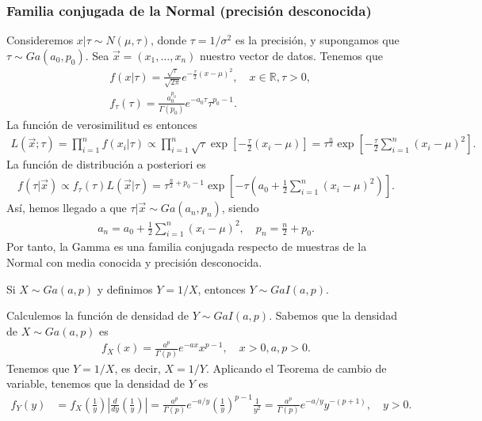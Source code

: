 \subsubsection{Familia conjugada de la Normal (precisión desconocida)}
Consideremos $x | \tau \sim N(\mu,\tau)$, donde $\tau = 1/\sigma^2$ es la precisión, y supongamos que $\tau \sim Ga(a_0,p_0)$. Sea $\vec{x} = (x_1,\ldots,x_n)$ nuestro vector de datos. Tenemos que
\begin{align*}
     & f(x |\tau) = \frac{\sqrt{\tau}}{\sqrt{2\pi}}e^{-\frac{\tau}{2}(x -\mu)^2}, \quad x \in \mathbb{R}, \tau > 0, \\
     & f_{\tau}(\tau) = \frac{a_0^{p_0}}{\Gamma(p_0)}e^{-a_0 \tau}\tau^{p_0-1}.
\end{align*}
La función de verosimilitud es entonces
\begin{align*}
    L(\vec{x};\tau) = \prod_{i=1}^{n} f(x_i | \tau) \propto \prod_{i=1}^{n} \sqrt{\tau} \exp\left[-\frac{\tau}{2}(x_i - \mu)\right] = \tau^{\frac{n}{2}}\exp\left[-\frac{\tau}{2} \sum_{i=1}^{n}(x_i -\mu)^2\right].
\end{align*}
La función de distribución a posteriori es
\begin{align*}
    f(\tau | \vec{x}) \propto f_{\tau}(\tau) L(\vec{x} | \tau) = \tau^{\frac{n}{2} + p_0 -1} \exp\left[ - \tau \left( a_0 + \frac{1}{2} \sum_{i=1}^{n}(x_i-\mu)^2 \right) \right].
\end{align*}
Así, hemos llegado a que $\tau | \vec{x} \sim Ga(a_n,p_n)$, siendo
\begin{align*}
    a_n = a_0 + \frac{1}{2} \sum_{i=1}^{n} (x_i - \mu)^2, \quad p_n = \frac{n}{2} + p_0.
\end{align*}
Por tanto, la Gamma es una familia conjugada respecto de muestras de la Normal con media conocida y precisión desconocida.

\begin{defi}
    Si $X \sim Ga(a,p)$ y definimos $Y = 1/X$, entonces $Y \sim  GaI(a,p)$.
\end{defi}
Calculemos la función de densidad de $Y \sim  GaI(a,p)$. Sabemos que la densidad de $X \sim Ga(a,p)$ es
\begin{align*}
    f_X(x) = \frac{a^p}{\Gamma(p)} e^{-ax}x^{p-1}, \quad x >0, a,p>0.
\end{align*}
Tenemos que $Y = 1/X$, es decir, $X = 1/Y$. Aplicando el Teorema de cambio de variable, tenemos que la densidad de $Y$ es
\begin{align*}
    f_Y(y) & = f_X\left( \frac{1}{y} \right) \left| \frac{d}{dy} \left( \frac{1}{y} \right) \right| = \frac{a^p}{\Gamma(p)} e^{-a/y} \left( \frac{1}{y} \right)^{p-1} \frac{1}{y^2}
    = \frac{a^p}{\Gamma(p)}  e^{-a/y} y^{-(p+1)}, \quad y > 0.
\end{align*}

